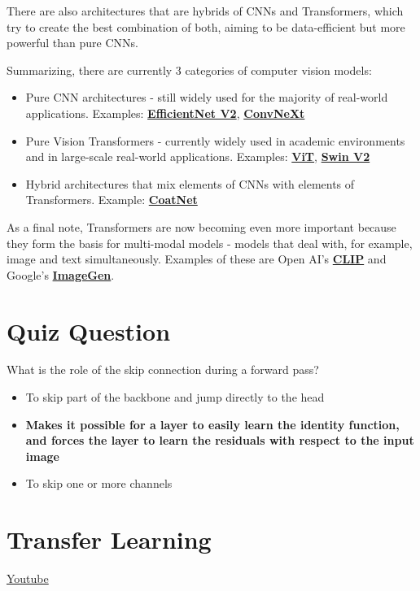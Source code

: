 There are also architectures that are hybrids of CNNs and Transformers, which try to create the best combination of both, aiming to be data-efficient but more powerful than pure CNNs.

Summarizing, there are currently 3 categories of computer vision models:

\begin{itemize}
    \item Pure CNN architectures - still widely used for the majority of real-world applications. Examples: \href{https://arxiv.org/abs/2104.00298}{\textbf{EfficientNet V2}}, \href{https://arxiv.org/abs/2201.03545}{\textbf{ConvNeXt}}
    \item Pure Vision Transformers - currently widely used in academic environments and in large-scale real-world applications. Examples: \href{https://arxiv.org/abs/2010.11929}{\textbf{ViT}}, \href{https://arxiv.org/abs/2111.09883}{\textbf{Swin V2}}
    \item Hybrid architectures that mix elements of CNNs with elements of Transformers. Example: \href{https://arxiv.org/abs/2106.04803}{\textbf{CoatNet}}
\end{itemize}
As a final note, Transformers are now becoming even more important because they form the basis for multi-modal models - models that deal with, for example, image and text simultaneously. Examples of these are Open AI's \href{https://openai.com/blog/clip/}{\textbf{CLIP}} and Google's \href{https://imagen.research.google/}{\textbf{ImageGen}}.

\section{Quiz Question}

What is the role of the skip connection during a forward pass?
\begin{itemize}
    \item To skip part of the backbone and jump directly to the head
    \item \textbf{Makes it possible for a layer to easily learn the identity function, and forces the layer to learn the residuals with respect to the input image}
    \item To skip one or more channels
\end{itemize}

\section{Transfer Learning}
\href{https://www.youtube.com/watch?v=yfPEROi3SPU&ab_channel=Udacity}{Youtube} \newline

